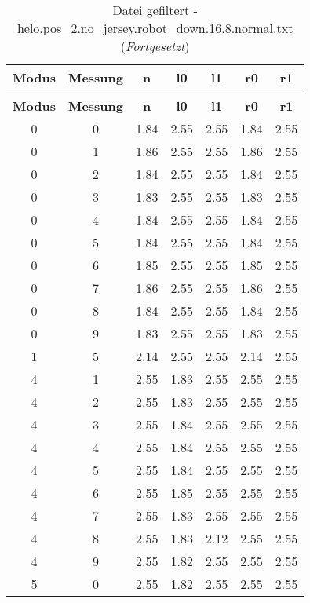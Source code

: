 \begin{longtable}{|c|c||c||c|c||c|c|}
	\caption{Datei gefiltert - helo.pos\_2.no\_jersey.robot\_down.16.8.normal.txt} \label{tab:helo.pos-2.no-jersey.robot-down.16.8.normal.txt} \\ \hline
	\textbf{Modus} & \textbf{Messung} & \textbf{n} & \textbf{l0} & \textbf{l1} & \textbf{r0} & \textbf{r1}\\ \hline
	\endfirsthead
	\caption[]{Datei gefiltert - helo.pos\_2.no\_jersey.robot\_down.16.8.normal.txt (\emph{Fortgesetzt})} \\ \hline
	\textbf{Modus} & \textbf{Messung} & \textbf{n} & \textbf{l0} & \textbf{l1} & \textbf{r0} & \textbf{r1}\\ \hline
	\endhead
	0 & 0 & 1.84 & 2.55 & 2.55 & 1.84 & 2.55 \\ \hline
	0 & 1 & 1.86 & 2.55 & 2.55 & 1.86 & 2.55 \\ \hline
	0 & 2 & 1.84 & 2.55 & 2.55 & 1.84 & 2.55 \\ \hline
	0 & 3 & 1.83 & 2.55 & 2.55 & 1.83 & 2.55 \\ \hline
	0 & 4 & 1.84 & 2.55 & 2.55 & 1.84 & 2.55 \\ \hline
	0 & 5 & 1.84 & 2.55 & 2.55 & 1.84 & 2.55 \\ \hline
	0 & 6 & 1.85 & 2.55 & 2.55 & 1.85 & 2.55 \\ \hline
	0 & 7 & 1.86 & 2.55 & 2.55 & 1.86 & 2.55 \\ \hline
	0 & 8 & 1.84 & 2.55 & 2.55 & 1.84 & 2.55 \\ \hline
	0 & 9 & 1.83 & 2.55 & 2.55 & 1.83 & 2.55 \\ \hline
	1 & 5 & 2.14 & 2.55 & 2.55 & 2.14 & 2.55 \\ \hline
	4 & 1 & 2.55 & 1.83 & 2.55 & 2.55 & 2.55 \\ \hline
	4 & 2 & 2.55 & 1.83 & 2.55 & 2.55 & 2.55 \\ \hline
	4 & 3 & 2.55 & 1.84 & 2.55 & 2.55 & 2.55 \\ \hline
	4 & 4 & 2.55 & 1.84 & 2.55 & 2.55 & 2.55 \\ \hline
	4 & 5 & 2.55 & 1.84 & 2.55 & 2.55 & 2.55 \\ \hline
	4 & 6 & 2.55 & 1.85 & 2.55 & 2.55 & 2.55 \\ \hline
	4 & 7 & 2.55 & 1.83 & 2.55 & 2.55 & 2.55 \\ \hline
	4 & 8 & 2.55 & 1.83 & 2.12 & 2.55 & 2.55 \\ \hline
	4 & 9 & 2.55 & 1.82 & 2.55 & 2.55 & 2.55 \\ \hline
	5 & 0 & 2.55 & 1.82 & 2.55 & 2.55 & 2.55 \\ \hline

\end{longtable}
